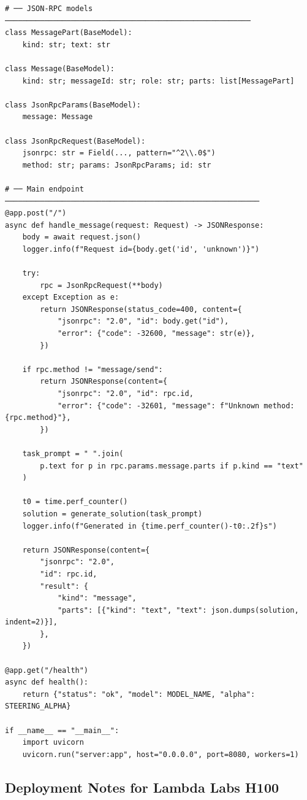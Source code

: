 \documentclass[11pt, a4paper]{article}
\begin{document}
\begin{codebox}
\begin{lstlisting}[style=python]
# ── JSON-RPC models ────────────────────────────────────────────────────────
class MessagePart(BaseModel):
    kind: str; text: str

class Message(BaseModel):
    kind: str; messageId: str; role: str; parts: list[MessagePart]

class JsonRpcParams(BaseModel):
    message: Message

class JsonRpcRequest(BaseModel):
    jsonrpc: str = Field(..., pattern="^2\\.0$")
    method: str; params: JsonRpcParams; id: str

# ── Main endpoint ──────────────────────────────────────────────────────────
@app.post("/")
async def handle_message(request: Request) -> JSONResponse:
    body = await request.json()
    logger.info(f"Request id={body.get('id', 'unknown')}")

    try:
        rpc = JsonRpcRequest(**body)
    except Exception as e:
        return JSONResponse(status_code=400, content={
            "jsonrpc": "2.0", "id": body.get("id"),
            "error": {"code": -32600, "message": str(e)},
        })

    if rpc.method != "message/send":
        return JSONResponse(content={
            "jsonrpc": "2.0", "id": rpc.id,
            "error": {"code": -32601, "message": f"Unknown method: {rpc.method}"},
        })

    task_prompt = " ".join(
        p.text for p in rpc.params.message.parts if p.kind == "text"
    )

    t0 = time.perf_counter()
    solution = generate_solution(task_prompt)
    logger.info(f"Generated in {time.perf_counter()-t0:.2f}s")

    return JSONResponse(content={
        "jsonrpc": "2.0",
        "id": rpc.id,
        "result": {
            "kind": "message",
            "parts": [{"kind": "text", "text": json.dumps(solution, indent=2)}],
        },
    })

@app.get("/health")
async def health():
    return {"status": "ok", "model": MODEL_NAME, "alpha": STEERING_ALPHA}

if __name__ == "__main__":
    import uvicorn
    uvicorn.run("server:app", host="0.0.0.0", port=8080, workers=1)
\end{lstlisting}
\end{codebox}

\subsection{Deployment Notes for Lambda Labs H100}
\end{document}
